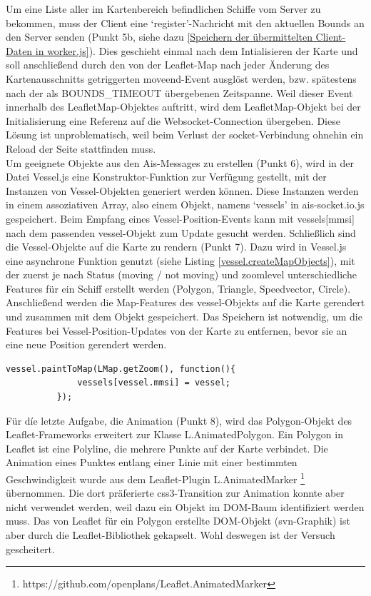 Um eine Liste aller im Kartenbereich befindlichen Schiffe vom Server zu bekommen, muss der Client eine ‘register’-Nachricht mit den aktuellen Bounds an den Server senden (Punkt 5b, siehe dazu \ref{Speichern der übermittelten Client-Daten in worker.js}).
Dies geschieht einmal nach dem Intialisieren der Karte und soll anschließend durch den von der Leaflet-Map nach jeder Änderung des Kartenausschnitts getriggerten moveend-Event ausglöst werden, bzw. spätestens nach der als BOUNDS\_TIMEOUT übergebenen Zeitspanne. Weil dieser Event innerhalb des LeafletMap-Objektes auftritt, wird dem LeafletMap-Objekt bei der Initialisierung eine Referenz auf die Websocket-Connection übergeben. Diese Lösung ist unproblematisch, weil beim Verlust der socket-Verbindung ohnehin ein Reload der Seite stattfinden muss.\\
Um geeignete Objekte aus den Ais-Messages zu erstellen (Punkt 6), wird in der Datei Vessel.js eine Konstruktor-Funktion zur Verfügung gestellt, mit der Instanzen von Vessel-Objekten generiert werden können. Diese Instanzen werden in einem assoziativen Array, also einem Objekt, namens ‘vessels’ in ais-socket.io.js gespeichert. Beim Empfang eines Vessel-Position-Events kann mit vessels[mmsi] nach dem passenden vessel-Objekt zum Update gesucht werden.
Schließlich sind die Vessel-Objekte auf die Karte zu rendern (Punkt 7). Dazu wird in Vessel.js eine asynchrone Funktion genutzt (siehe Listing \ref{vessel.createMapObjects}), mit der zuerst je nach Status (moving / not moving) und zoomlevel unterschiedliche Features für ein Schiff erstellt werden (Polygon, Triangle, Speedvector, Circle). Anschließend werden die Map-Features des vessel-Objekts auf die Karte gerendert und zusammen mit dem Objekt gespeichert. Das Speichern ist notwendig, um die Features bei Vessel-Position-Updates von der Karte zu entfernen, bevor sie an eine neue Position gerendert werden.
\begin{lstlisting}[caption=Aufruf der public function paintToMap des Vessel-Objekts in ais-socket.io.js, label=vessel.paintToMap]
          vessel.paintToMap(LMap.getZoom(), function(){
              vessels[vessel.mmsi] = vessel;
          });
\end{lstlisting}

Für díe letzte Aufgabe, die Animation (Punkt 8), wird das Polygon-Objekt des Leaflet-Frameworks erweitert zur Klasse L.AnimatedPolygon. Ein Polygon in Leaflet ist eine Polyline, die mehrere Punkte auf der Karte verbindet. Die Animation eines Punktes entlang einer Linie mit einer bestimmten Geschwindigkeit wurde aus dem Leaflet-Plugin L.AnimatedMarker \footnote{https://github.com/openplans/Leaflet.AnimatedMarker} übernommen. Die dort präferierte css3-Transition zur Animation konnte aber nicht verwendet werden, weil dazu ein Objekt im DOM-Baum identifiziert werden muss. Das von Leaflet für ein Polygon erstellte DOM-Objekt (svn-Graphik) ist aber durch die Leaflet-Bibliothek gekapselt. Wohl deswegen ist der Versuch gescheitert.\\

